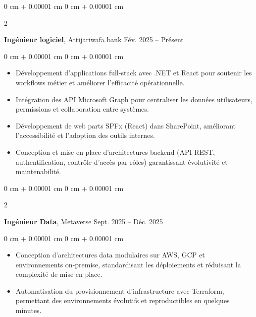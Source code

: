 \documentclass[10pt, letterpaper]{article}
\newenvironment{highlights}{
    \begin{itemize}[
        topsep=0.10 cm,
        parsep=0.10 cm,
        partopsep=0pt,
        itemsep=0pt,
        leftmargin=0 cm + 10pt
    ]
}{
    \end{itemize}
} %
\newenvironment{onecolentry}{
    \begin{adjustwidth}{
        0 cm + 0.00001 cm
    }{
        0 cm + 0.00001 cm
    }
}{
    \end{adjustwidth}
} %
\newenvironment{twocolentry}[2][]{
    \onecolentry
    \def\secondColumn{#2}
    \setcolumnwidth{\fill, 4.5 cm}
    \begin{paracol}{2}
}{
    \switchcolumn \raggedleft \secondColumn
    \end{paracol}
    \endonecolentry
} %
\begin{document}
     \begin{twocolentry}{
            Fév. 2025 –  Présent
        }
            \textbf{Ingénieur logiciel}, Attijariwafa bank \end{twocolentry}

        \vspace{0.10 cm}
        \begin{onecolentry}
            \begin{highlights}
\item Développement d’applications full-stack avec .NET et React pour soutenir les workflows métier et améliorer l’efficacité opérationnelle.
    \item Intégration des API Microsoft Graph pour centraliser les données utilisateurs, permissions et collaboration entre systèmes.
    \item Développement de web parts SPFx (React) dans SharePoint, améliorant l’accessibilité et l’adoption des outils internes.
    \item Conception et mise en place d’architectures backend (API REST, authentification, contrôle d’accès par rôles) garantissant évolutivité et maintenabilité.



            \end{highlights}
        \end{onecolentry}


        \vspace{0.2 cm}


    \begin{twocolentry}{
            Sept. 2025 –  Déc. 2025
        }
            \textbf{Ingénieur Data}, Metaverse \end{twocolentry}

        \vspace{0.10 cm}
        \begin{onecolentry}
            \begin{highlights}
                \item Conception d’architectures data modulaires sur AWS, GCP et environnements on-premise, standardisant les déploiements et réduisant la complexité de mise en place.
                \item Automatisation du provisionnement d’infrastructure avec Terraform, permettant des environnements évolutifs et reproductibles en quelques minutes.


            \end{highlights}
        \end{onecolentry}
\end{document}
